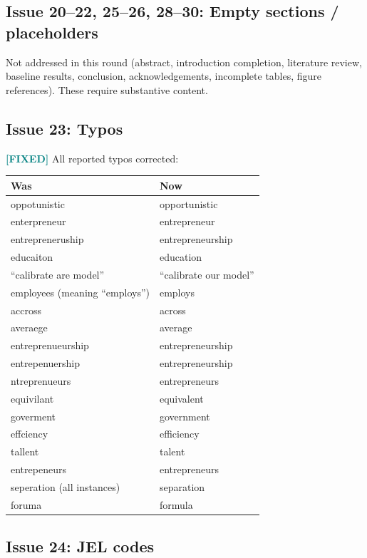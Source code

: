 \documentclass[11pt]{article}
\newcommand{\fixed}{\textcolor{teal}{\textbf{[FIXED]}}}
\begin{document}
\subsection*{Issue 20--22, 25--26, 28--30: Empty sections / placeholders}

Not addressed in this round (abstract, introduction completion, literature review, baseline results, conclusion, acknowledgements, incomplete tables, figure references). These require substantive content.

\subsection*{Issue 23: Typos}

\fixed{} All reported typos corrected:

\begin{center}
\begin{tabular}{ll}
\hline\hline
\textbf{Was} & \textbf{Now} \\
\hline
oppotunistic & opportunistic \\
enterpreneur & entrepreneur \\
entrepreneruship & entrepreneurship \\
educaiton & education \\
``calibrate are model'' & ``calibrate our model'' \\
employees (meaning ``employs'') & employs \\
accross & across \\
averaege & average \\
entreprenueurship & entrepreneurship \\
entrepenuership & entrepreneurship \\
ntreprenueurs & entrepreneurs \\
equivilant & equivalent \\
goverment & government \\
effciency & efficiency \\
tallent & talent \\
entrepeneurs & entrepreneurs \\
seperation (all instances) & separation \\
foruma & formula \\
\hline\hline
\end{tabular}
\end{center}

\subsection*{Issue 24: JEL codes}
\end{document}
